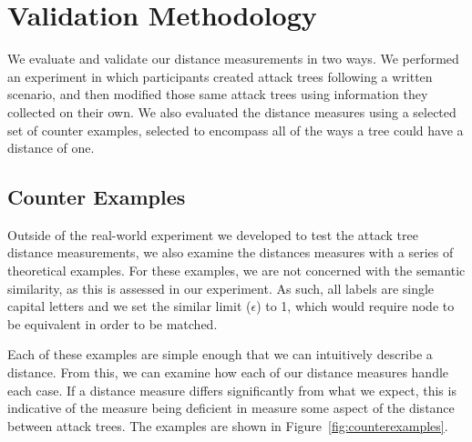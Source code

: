 \section{Validation Methodology}
\label{sec:methodology}

We evaluate and validate our distance measurements in two ways. We performed an experiment in which participants created attack trees following a written scenario, and then modified those same attack trees using information they collected on their own. We also evaluated the distance measures using a selected set of counter examples, selected to encompass all of the ways a tree could have a distance of one.





\subsection{Counter Examples}
\label{ssec:methodology-examples}


Outside of the real-world experiment we developed to test the attack tree distance measurements, we also examine the distances measures with a series of theoretical examples. For these examples, we are not concerned with the semantic similarity,  as this is assessed in our experiment. As such, all labels are single capital letters and we set the similar limit ($\epsilon$) to 1, which would require node to be equivalent in order to be matched.

Each of these examples are simple enough that we can intuitively describe a distance. From this, we can examine how each of our distance measures handle each case. If a distance measure differs significantly from what we expect, this is indicative of the measure being deficient in measure some aspect of the distance between attack trees. The examples are shown in Figure~\ref{fig:counterexamples}.


